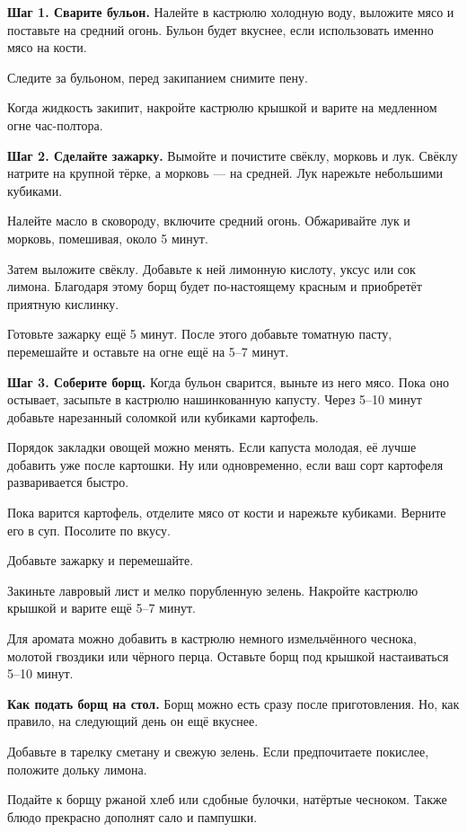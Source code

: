 \textbf{Шаг 1. Сварите бульон.} Налейте в кастрюлю холодную воду, выложите мясо и поставьте на средний огонь. Бульон будет вкуснее, если использовать именно мясо на кости.

Следите за бульоном, перед закипанием снимите пену.

Когда жидкость закипит, накройте кастрюлю крышкой и варите на медленном огне час-полтора.

\textbf{Шаг 2. Сделайте зажарку.}
Вымойте и почистите свёклу, морковь и лук. Свёклу натрите на крупной тёрке, а морковь — на средней. Лук нарежьте небольшими кубиками.

Налейте масло в сковороду, включите средний огонь. Обжаривайте лук и морковь, помешивая, около 5 минут.

Затем выложите свёклу. Добавьте к ней лимонную кислоту, уксус или сок лимона. Благодаря этому борщ будет по-настоящему красным и приобретёт приятную кислинку.

Готовьте зажарку ещё 5 минут. После этого добавьте томатную пасту, перемешайте и оставьте на огне ещё на 5–7 минут.

\textbf{Шаг 3. Соберите борщ.}
Когда бульон сварится, выньте из него мясо. Пока оно остывает, засыпьте в кастрюлю нашинкованную капусту. Через 5–10 минут добавьте нарезанный соломкой или кубиками картофель.

Порядок закладки овощей можно менять. Если капуста молодая, её лучше добавить уже после картошки. Ну или одновременно, если ваш сорт картофеля разваривается быстро.

Пока варится картофель, отделите мясо от кости и нарежьте кубиками. Верните его в суп. Посолите по вкусу.

Добавьте зажарку и перемешайте.

Закиньте лавровый лист и мелко порубленную зелень. Накройте кастрюлю крышкой и варите ещё 5–7 минут.

Для аромата можно добавить в кастрюлю немного измельчённого чеснока, молотой гвоздики или чёрного перца. Оставьте борщ под крышкой настаиваться 5–10 минут.

\textbf{Как подать борщ на стол.} Борщ можно есть сразу после приготовления. Но, как правило, на следующий день он ещё вкуснее.

Добавьте в тарелку сметану и свежую зелень. Если предпочитаете покислее, положите дольку лимона.

Подайте к борщу ржаной хлеб или сдобные булочки, натёртые чесноком. Также блюдо прекрасно дополнят сало и пампушки.


